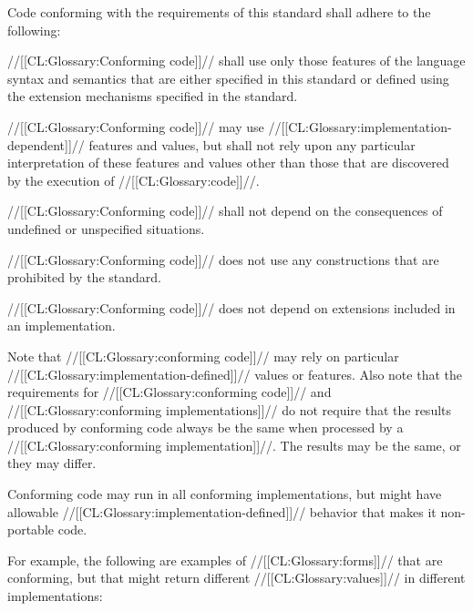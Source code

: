 \endsubSection%

 

Code conforming with the requirements of this standard shall adhere to the following:

\beginlist
  //[[CL:Glossary:Conforming code]]// shall use only those features of the
               language syntax and semantics that are  	       either specified in this standard 		   or defined using the extension mechanisms  		      specified in the standard.

 

 //[[CL:Glossary:Conforming code]]// may use 	      //[[CL:Glossary:implementation-dependent]]// features and values,  	      but shall not rely upon 	      any particular interpretation of these features and values  	      other than those that are discovered by the execution of //[[CL:Glossary:code]]//.

 //[[CL:Glossary:Conforming code]]// shall not depend on the consequences 	      of undefined or unspecified situations.

 //[[CL:Glossary:Conforming code]]// does not use any constructions  	      that are prohibited by the standard.

 //[[CL:Glossary:Conforming code]]// does not depend on extensions  	      included in an implementation. \endlist 


Note that //[[CL:Glossary:conforming code]]// may rely on particular //[[CL:Glossary:implementation-defined]]// values or features. Also note that the requirements for //[[CL:Glossary:conforming code]]// and //[[CL:Glossary:conforming implementations]]// do not require that the results produced by conforming code always be the same when processed by a //[[CL:Glossary:conforming implementation]]//. The results may be the same, or they may differ.

  Conforming code may run in all conforming implementations, but might have allowable //[[CL:Glossary:implementation-defined]]// behavior that makes it non-portable code.

For example, the following are examples of //[[CL:Glossary:forms]]// that are conforming, but that might return different //[[CL:Glossary:values]]// in different implementations:

